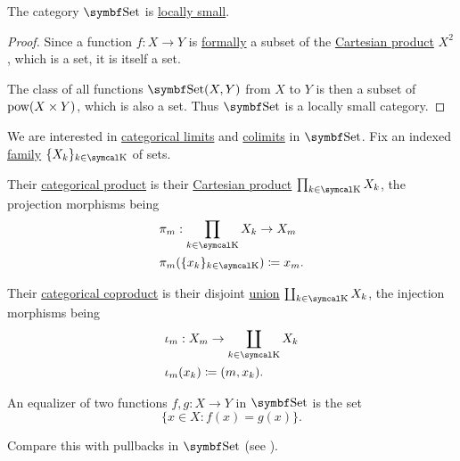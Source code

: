 \begin{proposition}\label{thm:set_is_locally_small}
  The category \( \Cat{Set} \) is \hyperref[def:category_cardinality]{locally small}.
\end{proposition}
\begin{proof}
  Since a function \( f: X \to Y \) is \hyperref[def:function]{formally} a subset of the \hyperref[def:cartesian_product]{Cartesian product} \( X^2 \), which is a set, it is itself a set.

  The class of all functions \( \Cat{Set}(X, Y) \) from \( X \) to \( Y \) is then a subset of \( \operatorname{pow}(X \times Y) \), which is also a set. Thus \( \Cat{Set} \) is a locally small category.
\end{proof}

\begin{proposition}\label{thm:set_categorical_limits}
  We are interested in \hyperref[def:categorical_limit]{categorical limits} and \hyperref[def:categorical_colimit]{colimits} in \( \Cat{Set} \). Fix an indexed \hyperref[def:indexed_family]{family} \( \{ X_k \}_{k \in \CK} \) of sets.
  \begin{DefEnum}
     Their \hyperref[def:categorical_product]{categorical product} is their \hyperref[def:cartesian_product]{Cartesian product} \( \prod_{k \in \CK} X_k \), the projection morphisms being
    \begin{align*}
       & \pi_m: \prod_{k \in \CK} X_k \to X_m        \\
       & \pi_m(\{ x_k \}_{k \in \CK}) \coloneqq x_m.
    \end{align*}

     Their \hyperref[def:categorical_coproduct]{categorical coproduct} is their disjoint \hyperref[def:disjoint_union]{union} \( \coprod_{k \in \CK} X_k \), the injection morphisms being
    \begin{align*}
       & \iota_m: X_m \to \coprod_{k \in \CK} X_k \\
       & \iota_m(x_k) \coloneqq (m, x_k).
    \end{align*}

     An equalizer of two functions \( f, g: X \to Y \) in \( \Cat{Set} \) is the set
    \begin{equation*}
      \{ x \in X \colon f(x) = g(x) \}.
    \end{equation*}

    Compare this with pullbacks in \( \Cat{Set} \) (see ).


\end{DefEnum}
\end{proposition}

